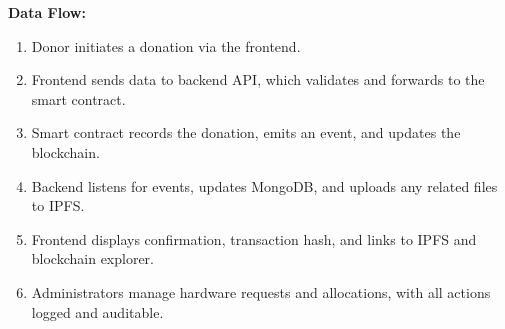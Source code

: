 \documentclass[a4paper,12pt]{report}
\begin{document}
\textbf{Data Flow:}
\begin{enumerate}
    \item Donor initiates a donation via the frontend.
    \item Frontend sends data to backend API, which validates and forwards to the smart contract.
    \item Smart contract records the donation, emits an event, and updates the blockchain.
    \item Backend listens for events, updates MongoDB, and uploads any related files to IPFS.
    \item Frontend displays confirmation, transaction hash, and links to IPFS and blockchain explorer.
    \item Administrators manage hardware requests and allocations, with all actions logged and auditable.
\end{enumerate}
\end{document}
